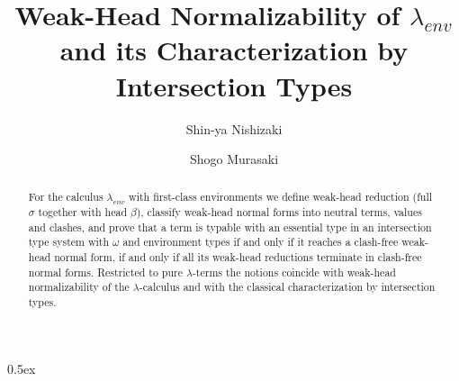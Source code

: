 \documentclass[11pt,a4paper]{article}
\begin{document}
\title{Weak-Head Normalizability of $\lambda_{env}$\\and its Characterization by Intersection Types}
\author{Shin-ya Nishizaki \and Shogo Murasaki}
\maketitle

\begin{abstract}
For the calculus $\lambda_{env}$ with first-class environments we define weak-head
reduction (full $\sigma$ together with head $\beta$), classify weak-head normal forms into
neutral terms, values and clashes, and prove that a term is typable with an essential
type in an intersection type system with $\omega$ and environment types if and only if it
reaches a clash-free weak-head normal form, if and only if all its weak-head reductions
terminate in clash-free normal forms.  Restricted to pure $\lambda$-terms the notions
coincide with weak-head normalizability of the $\lambda$-calculus and with the classical
characterization by intersection types.
\end{abstract}

\tableofcontents

\parindent 0pt\parskip 0.5ex


\end{document}
